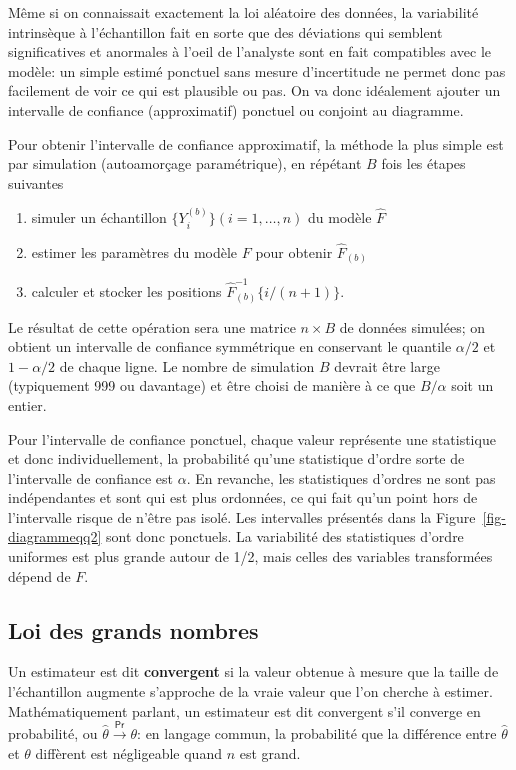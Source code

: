\documentclass[
  11pt,
  letterpaper,
]{scrbook}
\providecommand{\tightlist}{%
  \setlength{\itemsep}{0pt}\setlength{\parskip}{0pt}}\usepackage{longtable,booktabs,array}
\theoremstyle{definition}
\theoremstyle{definition}
\theoremstyle{remark}
\begin{document}
Même si on connaissait exactement la loi aléatoire des données, la
variabilité intrinsèque à l'échantillon fait en sorte que des déviations
qui semblent significatives et anormales à l'oeil de l'analyste sont en
fait compatibles avec le modèle: un simple estimé ponctuel sans mesure
d'incertitude ne permet donc pas facilement de voir ce qui est plausible
ou pas. On va donc idéalement ajouter un intervalle de confiance
(approximatif) ponctuel ou conjoint au diagramme.

Pour obtenir l'intervalle de confiance approximatif, la méthode la plus
simple est par simulation (autoamorçage paramétrique), en répétant \(B\)
fois les étapes suivantes

\begin{enumerate}
\def\labelenumi{\arabic{enumi}.}
\tightlist
\item
  simuler un échantillon \(\{Y^{(b)}_{i}\} (i=1,\ldots, n)\) du modèle
  \(\widehat{F}\)
\item
  estimer les paramètres du modèle \(F\) pour obtenir
  \(\widehat{F}_{(b)}\)
\item
  calculer et stocker les positions
  \(\widehat{F}^{-1}_{(b)}\{i/(n+1)\}\).
\end{enumerate}

Le résultat de cette opération sera une matrice \(n \times B\) de
données simulées; on obtient un intervalle de confiance symmétrique en
conservant le quantile \(\alpha/2\) et \(1-\alpha/2\) de chaque ligne.
Le nombre de simulation \(B\) devrait être large (typiquement 999 ou
davantage) et être choisi de manière à ce que \(B/\alpha\) soit un
entier.

Pour l'intervalle de confiance ponctuel, chaque valeur représente une
statistique et donc individuellement, la probabilité qu'une statistique
d'ordre sorte de l'intervalle de confiance est \(\alpha\). En revanche,
les statistiques d'ordres ne sont pas indépendantes et sont qui est plus
ordonnées, ce qui fait qu'un point hors de l'intervalle risque de n'être
pas isolé. Les intervalles présentés dans la
Figure~\ref{fig-diagrammeqq2} sont donc ponctuels. La variabilité des
statistiques d'ordre uniformes est plus grande autour de 1/2, mais
celles des variables transformées dépend de \(F\).

\subsection{Loi des grands nombres}\label{loi-grands-nombres}

Un estimateur est dit \textbf{convergent} si la valeur obtenue à mesure
que la taille de l'échantillon augmente s'approche de la vraie valeur
que l'on cherche à estimer. Mathématiquement parlant, un estimateur est
dit convergent s'il converge en probabilité, ou
\(\hat{\theta} \stackrel{\mathsf{Pr}}{\to} \theta\): en langage commun,
la probabilité que la différence entre \(\hat{\theta}\) et \(\theta\)
diffèrent est négligeable quand \(n\) est grand.
\end{document}
